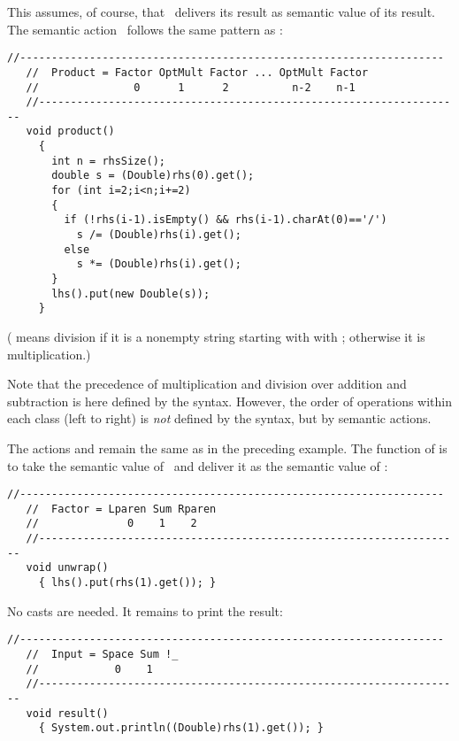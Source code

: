 This assumes, of course, that \Product\ delivers its result as semantic value
of its result.
The semantic action \Producta\ follows the same pattern as \Suma:

\small
\begin{Verbatim}[frame=single,framesep=2mm,samepage=true,xleftmargin=15mm,xrightmargin=15mm,baselinestretch=0.8]
   //-------------------------------------------------------------------
   //  Product = Factor OptMult Factor ... OptMult Factor 
   //               0      1      2          n-2    n-1
   //-------------------------------------------------------------------
   void product()
     {        
       int n = rhsSize();
       double s = (Double)rhs(0).get();
       for (int i=2;i<n;i+=2)
       {
         if (!rhs(i-1).isEmpty() && rhs(i-1).charAt(0)=='/')
           s /= (Double)rhs(i).get();
         else  
           s *= (Double)rhs(i).get();
       }  
       lhs().put(new Double(s));
     }
\end{Verbatim}
\normalsize

( 
means division if it is a nonempty string starting with with ;
otherwise it is multiplication.)

Note that the precedence of multiplication and division 
over addition and subtraction is here defined by the syntax.
However, the order of operations within each class (left to right)
is \emph{not} defined by the syntax, but by semantic actions.

The actions  and  
remain the same as in the preceding example.
The function of  is to take the semantic value of \Sum\
and deliver it as the semantic value of \Factor:

\small
\begin{Verbatim}[frame=single,framesep=2mm,samepage=true,xleftmargin=15mm,xrightmargin=15mm,baselinestretch=0.8]
   //-------------------------------------------------------------------
   //  Factor = Lparen Sum Rparen 
   //              0    1    2
   //-------------------------------------------------------------------
   void unwrap()
     { lhs().put(rhs(1).get()); }
\end{Verbatim}
\normalsize

No casts are needed.
It remains to print the result:

\small
\begin{Verbatim}[frame=single,framesep=2mm,samepage=true,xleftmargin=15mm,xrightmargin=15mm,baselinestretch=0.8]
   //-------------------------------------------------------------------
   //  Input = Space Sum !_
   //            0    1
   //-------------------------------------------------------------------
   void result()
     { System.out.println((Double)rhs(1).get()); }
\end{Verbatim}
\normalsize

